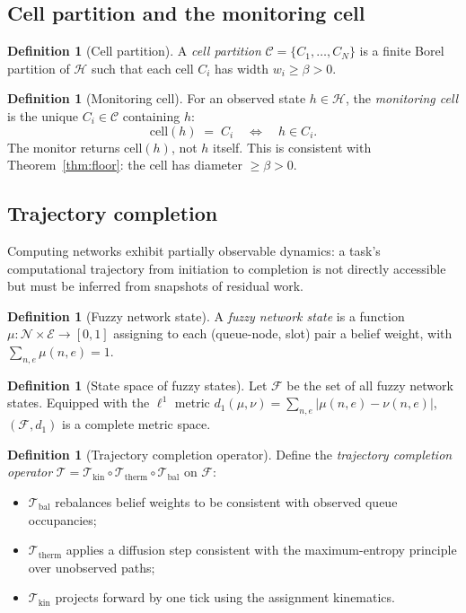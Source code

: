\documentclass[11pt,twocolumn,a4paper]{article}
\theoremstyle{plain}
\theoremstyle{definition}
\newtheorem{definition}[theorem]{Definition}
\theoremstyle{remark}
\newcommand{\N}{\mathcal{N}}
\newcommand{\E}{\mathcal{E}}
\newcommand{\T}{\mathcal{T}}
\newcommand{\H}{\mathcal{H}}
\newcommand{\C}{\mathcal{C}}
\newcommand{\F}{\mathcal{F}}
\newcommand{\floor}{\beta}
\newcommand{\cell}{\mathrm{cell}}
\begin{document}
\subsection{Cell partition and the monitoring cell}

\begin{definition}[Cell partition]
\label{def:cellpartition}
A \emph{cell partition} $\C = \{C_1, \ldots, C_N\}$ is a finite Borel partition of $\H$ such that each cell $C_i$ has width $w_i \geq \floor > 0$.
\end{definition}

\begin{definition}[Monitoring cell]
\label{def:moncell}
For an observed state $h \in \H$, the \emph{monitoring cell} is the unique $C_i \in \C$ containing $h$:
\[
  \cell(h) \;=\; C_i \quad \Leftrightarrow \quad h \in C_i.
\]
The monitor returns $\cell(h)$, not $h$ itself. This is consistent with Theorem~\ref{thm:floor}: the cell has diameter $\geq \floor > 0$.
\end{definition}

\subsection{Trajectory completion}

Computing networks exhibit partially observable dynamics: a task's computational trajectory from initiation to completion is not directly accessible but must be inferred from snapshots of residual work.

\begin{definition}[Fuzzy network state]
\label{def:fuzzy}
A \emph{fuzzy network state} is a function $\mu : \N \times \E \to [0,1]$ assigning to each (queue-node, slot) pair a belief weight, with $\sum_{n,e} \mu(n,e) = 1$.
\end{definition}

\begin{definition}[State space of fuzzy states]
\label{def:fuzzyspace}
Let $\F$ be the set of all fuzzy network states. Equipped with the $\ell^1$ metric $d_1(\mu, \nu) = \sum_{n,e} |\mu(n,e) - \nu(n,e)|$, $(\F, d_1)$ is a complete metric space.
\end{definition}

\begin{definition}[Trajectory completion operator]
\label{def:trajop}
Define the \emph{trajectory completion operator} $\T = \T_{\mathrm{kin}} \circ \T_{\mathrm{therm}} \circ \T_{\mathrm{bal}}$ on $\F$:
\begin{itemize}[nosep]
\item $\T_{\mathrm{bal}}$ rebalances belief weights to be consistent with observed queue occupancies;
\item $\T_{\mathrm{therm}}$ applies a diffusion step consistent with the maximum-entropy principle over unobserved paths;
\item $\T_{\mathrm{kin}}$ projects forward by one tick using the assignment kinematics.
\end{itemize}
\end{definition}
\end{document}
